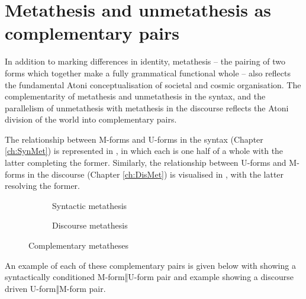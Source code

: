 \section{Metathesis and unmetathesis as complementary pairs}\label{sec:MetPar}
In addition to marking differences in identity,
metathesis -- the pairing of two forms which together make a fully grammatical functional whole --
also reflects the fundamental Atoni
conceptualisation of societal and cosmic organisation.
The complementarity of metathesis and unmetathesis in the syntax,
and the parallelism of unmetathesis with metathesis in the discourse
reflects the Atoni division of the world into complementary pairs.

The relationship between M-forms and U-forms in the syntax (Chapter \ref{ch:SynMet})
is represented in ,
in which each is one half of a whole with the latter completing the former.
Similarly, the relationship between U-forms and M-forms in the discourse (Chapter \ref{ch:DisMet})
is visualised in ,
with the latter resolving the former.

\begin{figure}[ht]
  \begin{subfigure}[b]{0.49\textwidth}
		\caption{Syntactic metathesis}\label{fig:SynMet}
  \end{subfigure}
  \begin{subfigure}[b]{0.49\textwidth}
		\caption{Discourse metathesis}\label{fig:DisMet}
  \end{subfigure}
	\caption{Complementary metatheses}\label{fig:CompMet}
\end{figure}

An example of each of these complementary pairs
is given below with 
showing a syntactically conditioned M-form‖U-form pair and example
 showing a discourse driven U-form‖M-form pair.

